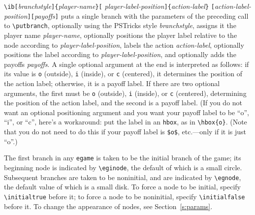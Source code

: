 \documentclass[12pt]{article}
\begin{document}
\vspace{4mm}

\noindent\verb+\ib[+\emph{branchstyle}\verb+]{+\emph{player-name}\verb+}[+%
\emph{player-label-position}\verb+]{+\emph{action-label}\verb+}+\newline
\verb+[+\emph{action-label-position}\verb+][+\emph{payoffs}{\tt ]}\newline
\noindent puts a single branch with the parameters of the preceding call to
\verb+\putbranch+, optionally using the PSTricks style \emph{branchstyle},
assigns it the player name \emph{player-name}, optionally positions the player
label relative to the node according to \emph{player-label-position}, labels
the action \emph{action-label}, optionally positions the label according to
\emph{player-label-position}, and optionally adds the payoffs \emph{payoffs}. 
A single optional argument at the end is interpreted as follows: if its value
is \verb+o+ (outside), \verb+i+ (inside), or \verb+c+ (centered), it
determines the position of the action label; otherwise, it is a payoff label. 
If there are two optional arguments, the first must be \verb+o+ (outside),
\verb+i+ (inside), or \verb+c+ (centered), determining the position of the
action label, and the second is a payoff label.  (If you do not want an
optional positioning argument and you want your payoff label to be ``o'',
``i'', or ``c'', here's a workaround: put the label in an \verb+hbox+, as in
\verb+\hbox{o}+.  (Note that you do not need to do this if your payoff label
is \verb+$o$+, etc.---only if it is just ``o''.)

The first branch in any {\tt egame} is taken to be the initial branch of the
game; its beginning node is indicated by \verb+\eginode+, the default of which
is a small circle.  Subsequent branches are taken to be noninitial, and are
indicated by \verb+\egnode+, the default value of which is a small disk.  To
force a node to be initial, specify \verb+\initialtrue+ before it; to force a
node to be noninitial, specify \verb+\initialfalse+ before it.  To change the
appearance of nodes, see Section~\ref{s:params}.
\end{document}
